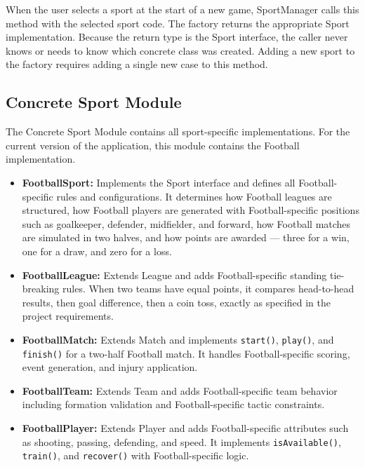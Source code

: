 \documentclass[12pt, a4paper]{article}
\begin{document}
When the user selects a sport at the start of a new game, SportManager calls this
method with the selected sport code. The factory returns the appropriate Sport
implementation. Because the return type is the Sport interface, the caller never knows
or needs to know which concrete class was created. Adding a new sport to the factory
requires adding a single new case to this method.

\subsection{Concrete Sport Module}

The Concrete Sport Module contains all sport-specific implementations. For the current
version of the application, this module contains the Football implementation.

\begin{itemize}
    \item \textbf{FootballSport:} Implements the Sport interface and defines all Football-specific rules and configurations. It determines how Football leagues are structured, how Football players are generated with Football-specific positions such as goalkeeper, defender, midfielder, and forward, how Football matches are simulated in two halves, and how points are awarded — three for a win, one for a draw, and zero for a loss.

    \item \textbf{FootballLeague:} Extends League and adds Football-specific standing tie-breaking rules. When two teams have equal points, it compares head-to-head results, then goal difference, then a coin toss, exactly as specified in the project requirements.

    \item \textbf{FootballMatch:} Extends Match and implements \texttt{start()}, \texttt{play()}, and \texttt{finish()} for a two-half Football match. It handles Football-specific scoring, event generation, and injury application.

    \item \textbf{FootballTeam:} Extends Team and adds Football-specific team behavior including formation validation and Football-specific tactic constraints.

    \item \textbf{FootballPlayer:} Extends Player and adds Football-specific attributes such as shooting, passing, defending, and speed. It implements \texttt{isAvailable()}, \texttt{train()}, and \texttt{recover()} with Football-specific logic.
\end{itemize}
\end{document}
